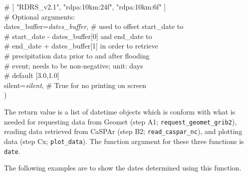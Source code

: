 \documentclass[10pt,a4paper,titlepage,parskip]{scrartcl}
\newenvironment{ttfont}{\fontfamily{\ttdefault}\selectfont}{\par}
\newcommand{\GRAU}[1]{\textcolor{ufzgray2}{#1}}
\begin{document}
\begin{framed}
\begin{ttfont}
\begin{tabbing}
			\> \> \GRAU{\# [ "RDRS\_v2.1", "rdpa:10km:24f", "rdpa:10km:6f" ]}\\
			\> \GRAU{\# Optional arguments:}\\
			\> dates\_buffer=\textit{dates\_buffer}, \> \GRAU{\# used to offset start\_date to}\\
			\> \> \GRAU{\# start\_date - dates\_buffer[0] and end\_date to }\\
			\> \> \GRAU{\# end\_date + dates\_buffer[1] in order to retrieve}\\
			\> \> \GRAU{\# precipitation data prior to and after flooding}\\
			\> \> \GRAU{\# event; needs to be non-negative; unit: days}\\
			\> \> \GRAU{\# default [3.0,1.0]}\\
			\> silent=\textit{silent}, \> \GRAU{\# True for no printing on screen}\\
			\> ) \> 
		\end{tabbing}
	\end{ttfont}
	\vspace*{-0.3cm}
\end{framed}
\vspace*{-0.3cm}
The return value is a list of datetime objects which is conform with what is needed for requesting data from Geomet (step A1; \texttt{request\_geomet\_grib2}), reading data retrieved from CaSPAr (step B2; \texttt{read\_caspar\_nc}), and plotting data (step Cx; \texttt{plot\_data}). The function argument for these three functions is \texttt{date}.
\pagebreak

The following examples are to show the dates determined using this function.
\end{document}
